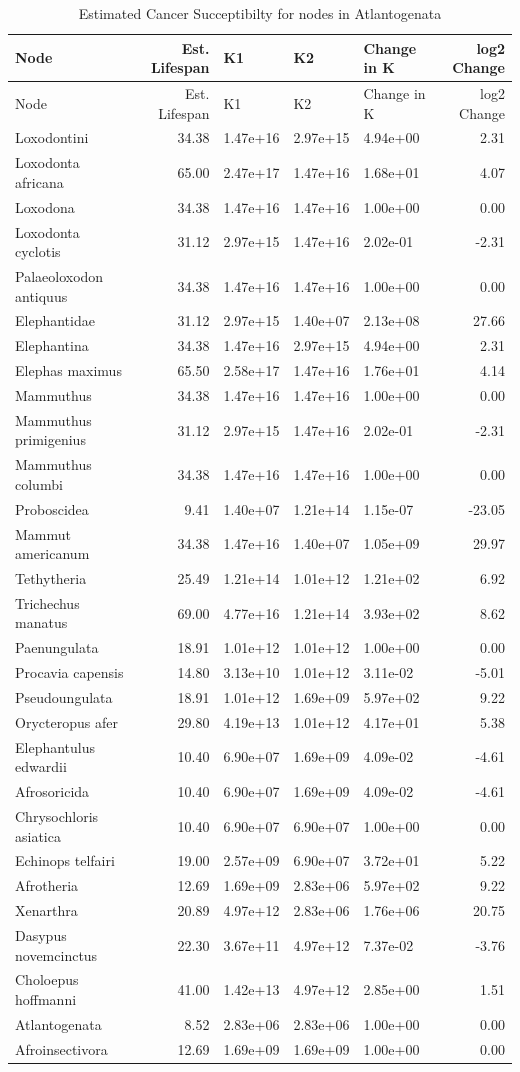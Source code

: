 \documentclass[]{elsarticle} %
\begin{document}
\begin{longtable}[]{@{}lrlllr@{}}
\caption{Estimated Cancer Succeptibilty for nodes in
Atlantogenata}\tabularnewline
\toprule
Node & Est. Lifespan & K1 & K2 & Change in K & log2
Change\tabularnewline
\midrule
\endfirsthead
\toprule
Node & Est. Lifespan & K1 & K2 & Change in K & log2
Change\tabularnewline
\midrule
\endhead
Loxodontini & 34.38 & 1.47e+16 & 2.97e+15 & 4.94e+00 &
2.31\tabularnewline
Loxodonta africana & 65.00 & 2.47e+17 & 1.47e+16 & 1.68e+01 &
4.07\tabularnewline
Loxodona & 34.38 & 1.47e+16 & 1.47e+16 & 1.00e+00 & 0.00\tabularnewline
Loxodonta cyclotis & 31.12 & 2.97e+15 & 1.47e+16 & 2.02e-01 &
-2.31\tabularnewline
Palaeoloxodon antiquus & 34.38 & 1.47e+16 & 1.47e+16 & 1.00e+00 &
0.00\tabularnewline
Elephantidae & 31.12 & 2.97e+15 & 1.40e+07 & 2.13e+08 &
27.66\tabularnewline
Elephantina & 34.38 & 1.47e+16 & 2.97e+15 & 4.94e+00 &
2.31\tabularnewline
Elephas maximus & 65.50 & 2.58e+17 & 1.47e+16 & 1.76e+01 &
4.14\tabularnewline
Mammuthus & 34.38 & 1.47e+16 & 1.47e+16 & 1.00e+00 & 0.00\tabularnewline
Mammuthus primigenius & 31.12 & 2.97e+15 & 1.47e+16 & 2.02e-01 &
-2.31\tabularnewline
Mammuthus columbi & 34.38 & 1.47e+16 & 1.47e+16 & 1.00e+00 &
0.00\tabularnewline
Proboscidea & 9.41 & 1.40e+07 & 1.21e+14 & 1.15e-07 &
-23.05\tabularnewline
Mammut americanum & 34.38 & 1.47e+16 & 1.40e+07 & 1.05e+09 &
29.97\tabularnewline
Tethytheria & 25.49 & 1.21e+14 & 1.01e+12 & 1.21e+02 &
6.92\tabularnewline
Trichechus manatus & 69.00 & 4.77e+16 & 1.21e+14 & 3.93e+02 &
8.62\tabularnewline
Paenungulata & 18.91 & 1.01e+12 & 1.01e+12 & 1.00e+00 &
0.00\tabularnewline
Procavia capensis & 14.80 & 3.13e+10 & 1.01e+12 & 3.11e-02 &
-5.01\tabularnewline
Pseudoungulata & 18.91 & 1.01e+12 & 1.69e+09 & 5.97e+02 &
9.22\tabularnewline
Orycteropus afer & 29.80 & 4.19e+13 & 1.01e+12 & 4.17e+01 &
5.38\tabularnewline
Elephantulus edwardii & 10.40 & 6.90e+07 & 1.69e+09 & 4.09e-02 &
-4.61\tabularnewline
Afrosoricida & 10.40 & 6.90e+07 & 1.69e+09 & 4.09e-02 &
-4.61\tabularnewline
Chrysochloris asiatica & 10.40 & 6.90e+07 & 6.90e+07 & 1.00e+00 &
0.00\tabularnewline
Echinops telfairi & 19.00 & 2.57e+09 & 6.90e+07 & 3.72e+01 &
5.22\tabularnewline
Afrotheria & 12.69 & 1.69e+09 & 2.83e+06 & 5.97e+02 &
9.22\tabularnewline
Xenarthra & 20.89 & 4.97e+12 & 2.83e+06 & 1.76e+06 &
20.75\tabularnewline
Dasypus novemcinctus & 22.30 & 3.67e+11 & 4.97e+12 & 7.37e-02 &
-3.76\tabularnewline
Choloepus hoffmanni & 41.00 & 1.42e+13 & 4.97e+12 & 2.85e+00 &
1.51\tabularnewline
Atlantogenata & 8.52 & 2.83e+06 & 2.83e+06 & 1.00e+00 &
0.00\tabularnewline
Afroinsectivora & 12.69 & 1.69e+09 & 1.69e+09 & 1.00e+00 &
0.00\tabularnewline
\bottomrule
\end{longtable}
\end{document}
